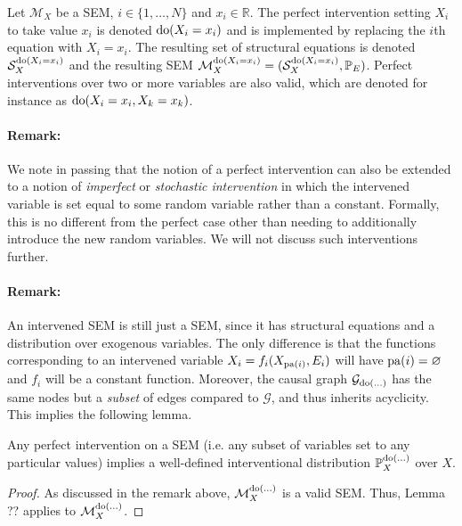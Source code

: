 \begin{definition}
	Let $\mathcal{M}_X$ be a SEM, $i \in \{1,\ldots,N \}$ and $x_i \in \mathbb{R}$. The perfect intervention setting $X_i$ to take value $x_i$ is denoted $\operatorname{do}(X_i = x_i)$ and is implemented by replacing the $i$th equation with $X_i = x_i$. The resulting set of structural equations is denoted $\mathcal{S}_X^{\operatorname{do}(X_i=x_i)}$ and the resulting SEM $\mathcal{M}_X^{\operatorname{do}(X_i=x_i)} = (\mathcal{S}_X^{\operatorname{do}(X_i=x_i)}, \mathbb{P}_E)$.
	Perfect interventions over two or more variables are also valid, which are denoted for instance as $\operatorname{do}(X_i = x_i, X_k = x_k)$.
\end{definition}

\paragraph{Remark:} We note in passing that the notion of a perfect intervention can also be extended to a notion of \emph{imperfect} or \emph{stochastic intervention} in which the intervened variable is set equal to some random variable rather than a constant. Formally, this is no different from the perfect case other than needing to additionally introduce the new random variables. We will not discuss such interventions further.

\paragraph{Remark:} An intervened SEM is still just a SEM, since it has structural equations and a distribution over exogenous variables. The only difference is that the functions corresponding to an intervened variable $X_i = f_i(X_{\operatorname{pa}(i)}, E_i)$ will have $\operatorname{pa}(i) = \varnothing$ and $f_i$ will be a constant function. Moreover, the causal graph $\mathcal{G}_{\operatorname{do}(\ldots)}$ has the same nodes but a \emph{subset} of edges compared to $\mathcal{G}$, and thus inherits acyclicity. This implies the following lemma.

\begin{lemma}
	Any perfect intervention on a SEM (i.e. any subset of variables set to any particular values) implies a well-defined interventional distribution $\mathbb{P}^{\operatorname{do}(...)}_X$ over $X$.
\end{lemma}
\begin{proof}
	As discussed in the remark above, $\mathcal{M}_X^{\operatorname{do}(...)}$ is a valid SEM. Thus, Lemma ?? applies to $\mathcal{M}_X^{\operatorname{do}(...)}$.
\end{proof}
	
